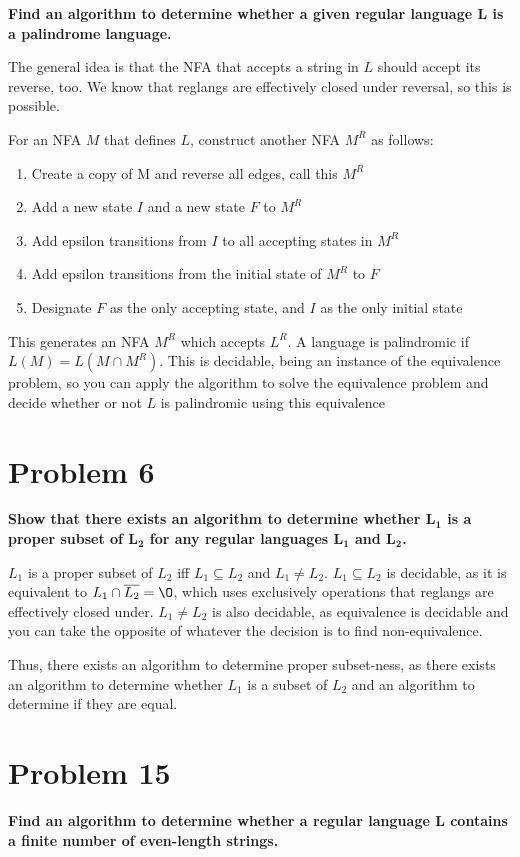 \documentclass{report}
\begin{document}
\textbf{Find an algorithm to determine whether a given regular language $\mathbf{L}$ is a palindrome language.}

The general idea is that the NFA that accepts a string in $L$ should accept its reverse, too. We know that reglangs are effectively closed under reversal, so this is possible.

For an NFA $M$ that defines $L$, construct another NFA $M^R$ as follows:
\begin{enumerate}
	\item Create a copy of M and reverse all edges, call this $M^R$
	\item Add a new state $I$ and a new state $F$ to $M^R$
	\item Add epsilon transitions from $I$ to all accepting states in $M^R$
	\item Add epsilon transitions from the initial state of $M^R$ to $F$ 
	\item Designate $F$ as the only accepting state, and $I$ as the only initial state
\end{enumerate}

This generates an NFA $M^R$ which accepts $L^R$. A language is palindromic if $L(M) = L(M \cap M^R)$. This is decidable, being an instance of the  equivalence problem, so you can apply the algorithm to solve the equivalence problem and decide whether or not $L$ is palindromic using this equivalence

\section*{Problem 6}
\textbf{Show that there exists an algorithm to determine whether $\mathbf{L_1}$ is a proper subset of $\mathbf{L_2}$ for any regular languages $\mathbf{L_1}$ and $\mathbf{L_2}$.}

$L_1$ is a proper subset of $L_2$ iff $L_1 \subseteq L_2$ and $L_1 \neq L_2$. $L_1 \subseteq L_2$ is decidable, as it is equivalent to $L_1 \cap \overline{L_2} = \O$, which uses exclusively operations that reglangs are effectively closed under. $L_1 \neq L_2$ is also decidable, as equivalence is decidable and you can take the opposite of whatever the decision is to find non-equivalence.

Thus, there exists an algorithm to determine proper subset-ness, as there exists an algorithm to determine whether $L_1$ is a subset of $L_2$ and an algorithm to determine if they are equal.

\section*{Problem 15}
\textbf{Find an algorithm to determine whether a regular language L contains a finite number of even-length strings.}
\end{document}
